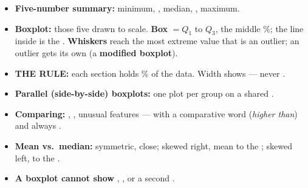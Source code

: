 \documentclass[12pt]{article}
\begin{document}
\boxguard[14]
\begin{tcolorbox}[enhanced, colback=sky, colframe=navy, boxrule=0.8pt, arc=2mm,
    left=3mm, right=3mm, top=1.5mm, bottom=1.5mm, breakable,
    fonttitle=\bfseries\small\color{white}, title={QuickNotes: Boxplots and Comparing Distributions},
    attach boxed title to top left={yshift=-2mm, xshift=4mm},
    boxed title style={colback=navy, colframe=navy, arc=1.5mm}]
\small
\begin{itemize}[leftmargin=1.1em, itemsep=3pt]
  \item \textbf{Five-number summary:} minimum, , median, , maximum.
  \item \textbf{Boxplot:} those five drawn to scale. \textbf{Box} $= Q_1$ to $Q_3$, the middle
        \%; the line inside is the . \textbf{Whiskers} reach the most
        extreme value that is  an outlier; an outlier gets its own 
        (a \textbf{modified boxplot}).
  \item \textbf{THE RULE:} each section holds \% of the data. Width shows
         --- never .
  \item \textbf{Parallel (side-by-side) boxplots:} one plot per group on a shared .
  \item \textbf{Comparing:} , , unusual features --- with a comparative
        word (\emph{higher than}) and always .
  \item \textbf{Mean vs.\ median:} symmetric, close; skewed right, mean to the ;
        skewed left, to the .
  \item \textbf{A boxplot cannot show} , , or a second .
\end{itemize}
\end{tcolorbox}
\end{document}
